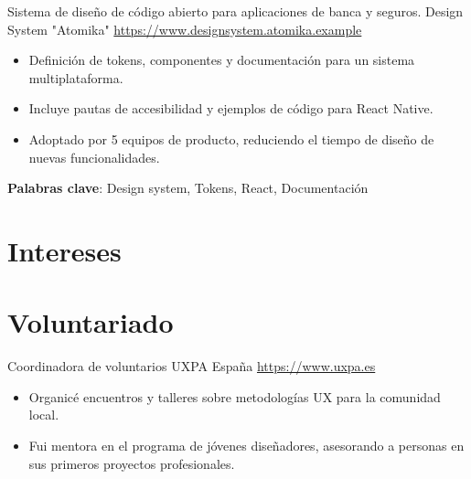 \documentclass[a4paper, serif, 10pt]{moderncv}
\begin{document}
        {Sistema de diseño de código abierto para aplicaciones de banca y seguros.}
        {Design System "Atomika"}
        {\url{https://www.designsystem.atomika.example}}
        {}
        {\begin{itemize}
\item Definición de tokens, componentes y documentación para un sistema multiplataforma.
\item Incluye pautas de accesibilidad y ejemplos de código para React Native.
\item Adoptado por 5 equipos de producto, reduciendo el tiempo de diseño de nuevas funcionalidades.
\end{itemize}
\textbf{Palabras clave}: Design system, Tokens, React, Documentación}
\section{Intereses}

\section{Voluntariado}

        {Coordinadora de voluntarios}
        {UXPA España}
        {\url{https://www.uxpa.es}}
        {}
        {\begin{itemize}
\item Organicé encuentros y talleres sobre metodologías UX para la comunidad local.
\item Fui mentora en el programa de jóvenes diseñadores, asesorando a personas en sus primeros proyectos profesionales.
\end{itemize}}
    
\end{document}
